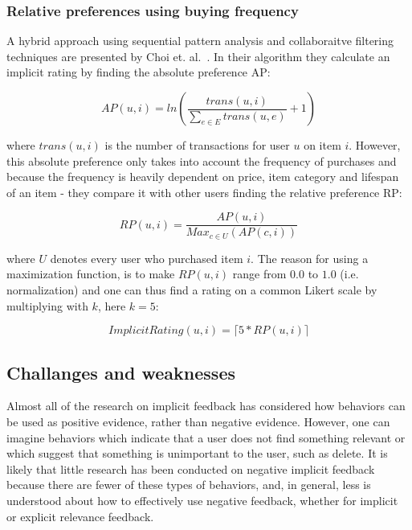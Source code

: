 \subsubsection{Relative preferences using buying frequency}

A hybrid approach using sequential pattern analysis and collaboraitve filtering
techniques are presented by Choi et. al. \cite{choi2012hybrid}. In their
algorithm they calculate an implicit rating by finding the absolute preference
AP:

\begin{equation}
  AP(u,i) = ln(\frac{trans(u,i)}{\sum_{e \in E}{trans(u, e)}} + 1)
\end{equation}

where $trans(u,i)$ is the number of transactions for user $u$ on item $i$.
However, this absolute preference only takes into account the frequency of
purchases and because the frequency is heavily dependent on price, item
category and lifespan of an item - they compare it with other users finding the
relative preference RP:

\begin{equation}
  RP(u,i) = \frac{AP(u,i)}{Max_{c \in U}(AP(c,i))}
\end{equation}

where $U$ denotes every user who purchased item $i$. The reason for using a
maximization function, is to make $RP(u,i)$ range from $0.0$ to $1.0$ (i.e.
normalization) and one can thus find a rating on a common Likert scale by
multiplying with $k$, here $k=5$:

\begin{equation}
  ImplicitRating(u,i) = \lceil 5 * RP(u,i) \rceil
\end{equation}


\subsection{Challanges and weaknesses}
\label{implicit-weaknesses}

Almost all of the research on implicit feedback has considered how behaviors
can be used as positive evidence, rather than negative evidence. However, one
can imagine behaviors which indicate that a user does not find something
relevant or which suggest that something is unimportant to the user, such as
delete. It is likely that little research has been conducted on negative
implicit feedback because there are fewer of these types of behaviors, and, in
general, less is understood about how to effectively use negative feedback,
whether for implicit or explicit relevance feedback.

